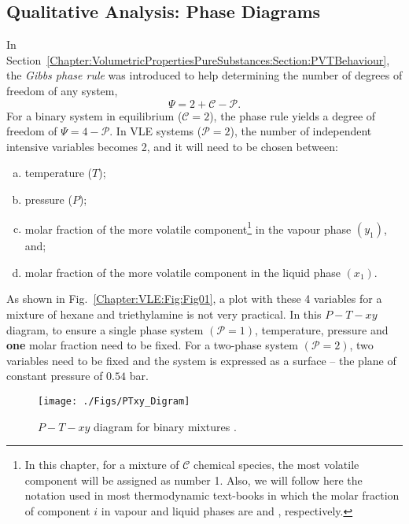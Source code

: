 \subsection{Qualitative Analysis: Phase Diagrams}\label{Chapter:VLE:Section:PhaseDiagrams}
In Section~\ref{Chapter:VolumetricPropertiesPureSubstances:Section:PVTBehaviour}, the {\it Gibbs phase rule} was introduced to help determining the number of degrees of freedom of any system,
    \begin{displaymath}
        \Psi = 2 + \mathcal{C} - \mathcal{P}.
    \end{displaymath}
For a binary system in equilibrium (\ie $\mathcal{C}=2$), the phase rule yields a degree of freedom of $\Psi=4-\mathcal{P}$. In VLE systems ($\mathcal{P}=2$), the number of independent intensive variables becomes 2, and it will need to be chosen between:
\begin{enumerate}[a)]
   \item temperature ($T$);
   \item pressure ($P$);
   \item molar fraction of the more volatile component\footnote{In this chapter, for a mixture of $\mathcal{C}$ chemical species, the most volatile component will be assigned as number 1. Also, we will follow here the notation used in most thermodynamic text-books in which the molar fraction of component $i$ in vapour and liquid phases are  and , respectively.} in the vapour phase $\left(y_{1}\right)$, and;
   \item molar fraction of the more volatile component in the liquid phase $\left(x_{1}\right)$.
\end{enumerate}
As shown in Fig.~\ref{Chapter:VLE:Fig:Fig01}, a plot with these 4 variables for a mixture of hexane and triethylamine is not very practical. In this $P-T-xy$ diagram, to ensure a single phase system $\left(\mathcal{P}=1\right)$, temperature, pressure and {\bf one} molar fraction need to be fixed. For a two-phase system $\left(\mathcal{P}=2\right)$, two variables need to be fixed and the system is expressed as a surface -- \eg the plane of constant pressure of $0.54$ bar. %
      \begin{figure}[h] 
         \begin{center}
             \texttt{[image: ./Figs/PTxy\_Digram]} 
             \vspace{-.1cm}\caption{$P-T-xy$ diagram for binary mixtures \citep[extracted from][]{SmithVanNess_Book}.}\label{Chapter:VLE:Fig:Fig02}
         \end{center}
       \end{figure}

